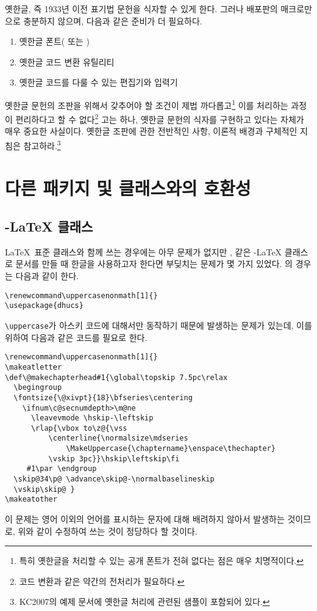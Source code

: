 \는 옛한글, 즉 1933년 이전 표기법 문헌을
식자할 수 있게 한다. 그러나 배포판의 매크로만으로 충분하지 않으며,
다음과 같은 준비가 더 필요하다.
\begin{enumerate}
\item 옛한글 폰트( 또는 )
\item 옛한글 코드 변환 유틸리티
\item 옛한글 코드를 다룰 수 있는 편집기와 입력기
\end{enumerate}

옛한글 문헌의 조판을 위해서 갖추어야 할
조건이 제법 까다롭고\footnote{%
  특히 옛한글을 처리할 수 있는 공개 폰트가 전혀 없다는 점은
  매우 치명적이다.}
이를 처리하는 과정이 편리하다고 할 수 없다\footnote{%
  코드 변환과 같은 약간의 전처리가 필요하다.}%
고는 하나, 옛한글 문헌의 식자를 구현하고 있다는 자체가 매우 중요한 사실이다.
옛한글 조판에 관한 전반적인 사항, 이론적 배경과 구체적인 지침은 \cite{LeeKH}\을
참고하라.\footnote{%
  KC2007의 예제 문서에 옛한글 처리에 관련된 샘플이 포함되어 있다.}

\section{다른 패키지 및 클래스와의 호환성}

\subsection{\texorpdfstring{\AmS-\LaTeX}{AmS-LaTeX} 클래스}
\를 \LaTeX\ 표준 클래스와 함께 쓰는 경우에는
아무 문제가 없지만 
, \과 같은 \AmS-\LaTeX{} 클래스로
문서를 만들 때 한글을 사용하고자 한다면 부딪치는 문제가 몇 가지
있었다. 의 경우는 다음과 같이 한다.
\begin{Verbatim}[fontsize=\small]
\renewcommand\uppercasenonmath[1]{}
\usepackage{dhucs}
\end{Verbatim}

\은 \verb|\uppercase|가 아스키 코드에 대해서만
동작하기 때문에 발생하는 문제가 있는데, 이를 위하여 다음과 같은
코드를 필요로 한다.
\begin{Verbatim}[fontsize=\small]
\renewcommand\uppercasenonmath[1]{}
\makeatletter
\def\@makechapterhead#1{\global\topskip 7.5pc\relax
  \begingroup
  \fontsize{\@xivpt}{18}\bfseries\centering
    \ifnum\c@secnumdepth>\m@ne
      \leavevmode \hskip-\leftskip
      \rlap{\vbox to\z@{\vss
          \centerline{\normalsize\mdseries
              \MakeUppercase{\chaptername}\enspace\thechapter}
          \vskip 3pc}}\hskip\leftskip\fi
     #1\par \endgroup
  \skip@34\p@ \advance\skip@-\normalbaselineskip
  \vskip\skip@ }
\makeatother
\end{Verbatim}
이 문제는 \이 영어 이외의 언어를 표시하는 문자에
대해 배려하지 않아서 발생하는 것이므로, 위와 같이 수정하여 쓰는
것이 정당하다 할 것이다.

